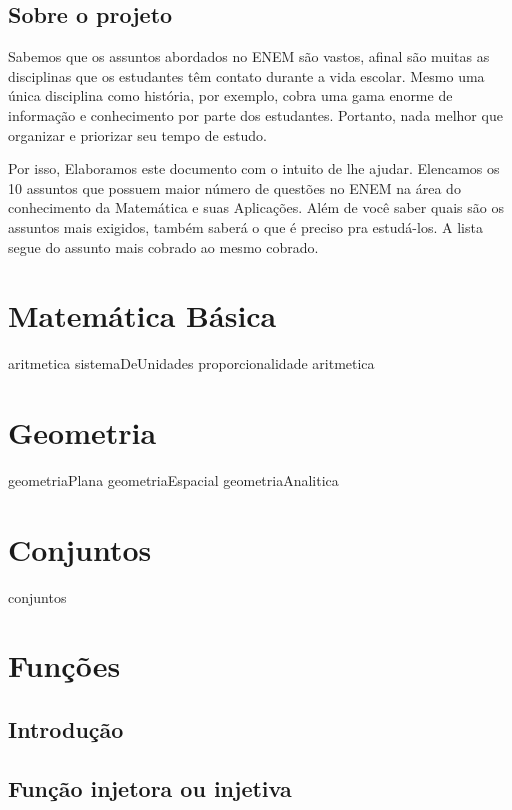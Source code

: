 \documentclass[11pt,fleqn]{book}
\begin{document}
\pagestyle{fancy} %

\chapter{Sobre o projeto}
Sabemos que os assuntos abordados no ENEM são vastos, afinal são muitas as disciplinas que os estudantes têm contato durante a vida escolar. Mesmo uma única disciplina como história, por exemplo, cobra uma gama enorme de informação e conhecimento por parte dos estudantes. Portanto, nada melhor que organizar e priorizar seu tempo de estudo.

Por isso, Elaboramos este documento com o intuito de lhe ajudar. Elencamos os 10 assuntos que possuem maior número de questões no ENEM na área do conhecimento da Matemática e suas Aplicações. Além de você saber quais são os assuntos mais exigidos, também saberá o que é preciso pra estudá-los. A lista segue do assunto mais cobrado ao mesmo cobrado.

\part{Matemática Básica}
{aritmetica}
{sistemaDeUnidades}
{proporcionalidade}
{aritmetica}

\part{Geometria}
{geometriaPlana}
{geometriaEspacial}
{geometriaAnalitica}

\part{Conjuntos}
{conjuntos}

\part{Funções}
\chapter{Introdução}

\chapter{Função injetora ou injetiva}
\end{document}
